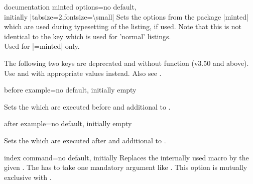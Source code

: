 \begin{docTcbKey}{documentation minted options}{=}{no default,\\\hspace*{\fill} initially |tabsize=2,fontsize=\textbackslash small|}
  Sets the options from the package |minted| \cite{poore:2015a}
  which are used during typesetting of the listing, if used.
  Note that this is not identical to the key
   which is used for 'normal' listings.\\
  Used for |=minted| only.
\end{docTcbKey}

\begin{marker}
The following two keys are deprecated and without function (v3.50 and above).
Use  and  with appropriate values
instead. Also see .
\end{marker}

\begin{docTcbKey}[][doc updated=2015-03-16]{before example}{=}{no default, initially empty}
\smallskip\begin{deprecated}
  Sets the  which are executed before  and 
  additional to .
\end{deprecated}
\end{docTcbKey}

\begin{docTcbKey}{after example}{=}{no default, initially empty}
\smallskip\begin{deprecated}
  Sets the  which are executed after  and 
  additional to .
\end{deprecated}
\end{docTcbKey}

\clearpage
\begin{docTcbKey}[][doc new=2015-01-09]{index command}{=}{no default, initially }
  Replaces the internally used  macro by the given .
  The  has to take one mandatory argument like .
  This option is mutually exclusive with .
\begin{dispListing}
\end{dispListing}
\end{docTcbKey}


